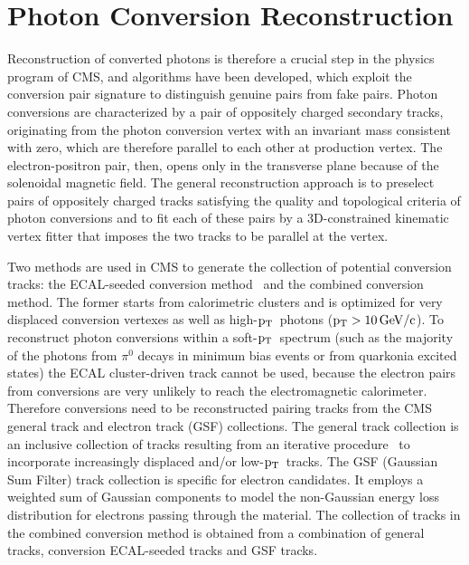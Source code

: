\documentclass[a4paper]{jpconf}
\def \pt{$\p_{\rm T}$~}
\begin{document}

\section{Photon Conversion Reconstruction}
\label{standard}


Reconstruction of converted photons is therefore a crucial step in the physics program of CMS, and  algorithms have been developed, which exploit the conversion pair signature to distinguish genuine pairs from fake pairs.
%
Photon conversions are characterized by a pair of
oppositely charged secondary tracks, originating from the photon conversion vertex with an
invariant mass consistent with zero,  which are therefore parallel
to each other at production vertex. The electron-positron pair, then,
opens only in the transverse plane because of the solenoidal magnetic field.
The general reconstruction approach is to preselect pairs of oppositely charged tracks satisfying the quality and topological criteria of photon conversions and to fit each of these pairs by a 3D-constrained kinematic vertex 
fitter that imposes the two tracks to be parallel at the vertex. 

Two methods are used in CMS to generate the collection of potential conversion tracks: the ECAL-seeded conversion method~\cite{EGM-10-005}  and the combined conversion method. The former starts from calorimetric clusters and is optimized for very displaced conversion vertexes as well as high-\pt photons ($\rm p_{T} >10{\rm \, GeV}/c$).
To reconstruct photon conversions within a soft-\pt spectrum (such as the majority of the photons from $\pi^0$ decays in minimum bias events or from quarkonia excited states) the ECAL cluster-driven track cannot be used,  because the electron pairs from conversions are very unlikely to reach the electromagnetic calorimeter.
Therefore  conversions need to be reconstructed pairing tracks from the  CMS general track and electron track (GSF) collections.
The general track collection is 
 an inclusive collection of   tracks resulting from an iterative procedure~\cite{TRK-10-001} to incorporate increasingly displaced and/or low-\pt tracks.
%
 The GSF (Gaussian Sum Filter) track collection is specific for electron candidates. It employs a 
  weighted  	sum of Gaussian components to model the non-Gaussian energy loss distribution for electrons passing through the material. 
%
The collection of tracks in the combined conversion method is obtained from a combination of general tracks,  conversion ECAL-seeded tracks and GSF tracks.
\end{document}
